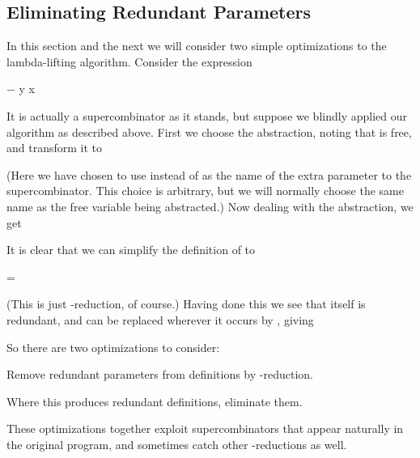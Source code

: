 \subsection{Eliminating Redundant Parameters}

In this section and the next we will consider two simple optimizations to the
lambda-lifting algorithm. Consider the expression
\begin{mlcoded}
    $-$ y x
\end{mlcoded}
It is actually a supercombinator as it stands, but suppose we blindly applied
our algorithm as described above. First we choose the  abstraction, noting
that  is free, and transform it to


\noindent
(Here we have chosen to use  instead of  as the name of the extra parameter
to the  supercombinator. This choice is arbitrary, but we will normally
choose the same name as the free variable being abstracted.) Now dealing
with the  abstraction, we get


It is clear that we can simplify the definition of  to

\begin{letalign}
     = 
\end{letalign}

\noindent
(This is just \te-reduction, of course.) Having done this we see that  itself is
redundant, and  can be replaced wherever it occurs by , giving


So there are two optimizations to consider:

\begin{numbered}
    \item Remove redundant parameters from definitions by \te-reduction.
    \item Where this produces redundant definitions, eliminate them.
\end{numbered}

These optimizations together exploit supercombinators that appear naturally
in the original program, and sometimes catch other \te-reductions as well.

